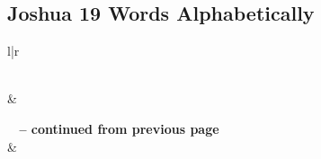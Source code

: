

\subsection{Joshua 19 Words Alphabetically}


\normalsize
 
\begin{center}
\begin{longtable}{l|r}
\caption[Joshua 19 Words Alphabetically]{Joshua 19 Words Alphabetically}\label{table:WordsAlphabetically for Joshua 19} \\
\hline {} &  \\ \hline 
\endfirsthead
 
{{\bfseries \tablename\ \thetable{} -- continued from previous page}} \\  
\hline {} &  \\ \hline 
\endhead
 

\end{longtable}
\end{center}
